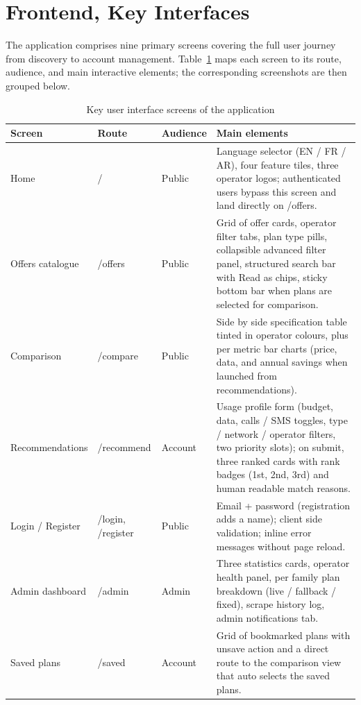 \section{Frontend, Key Interfaces}

The application comprises nine primary screens covering the full user journey from discovery to account management. Table~\ref{tab:ui-screens} maps each screen to its route, audience, and main interactive elements; the corresponding screenshots are then grouped below.

\begin{table}[H]
  \caption{Key user interface screens of the application}
  \label{tab:ui-screens}
  \centering\small
  \begin{tabular}{|p{2.6cm}|p{2.5cm}|p{1.6cm}|p{6.4cm}|}
    \hline
    \textbf{Screen} & \textbf{Route} & \textbf{Audience} & \textbf{Main elements} \\ \hline
    Home               & /           & Public  & Language selector (EN / FR / AR), four feature tiles, three operator logos; authenticated users bypass this screen and land directly on /offers. \\ \hline
    Offers catalogue   & /offers     & Public  & Grid of offer cards, operator filter tabs, plan type pills, collapsible advanced filter panel, structured search bar with \guillemotleft{}Read as\guillemotright{} chips, sticky bottom bar when plans are selected for comparison. \\ \hline
    Comparison         & /compare    & Public  & Side by side specification table tinted in operator colours, plus per metric bar charts (price, data, and annual savings when launched from recommendations). \\ \hline
    Recommendations    & /recommend  & Account & Usage profile form (budget, data, calls / SMS toggles, type / network / operator filters, two priority slots); on submit, three ranked cards with rank badges (1st, 2nd, 3rd) and human readable match reasons. \\ \hline
    Login / Register   & /login, /register & Public & Email + password (registration adds a name); client side validation; inline error messages without page reload. \\ \hline
    Admin dashboard    & /admin      & Admin   & Three statistics cards, operator health panel, per family plan breakdown (live / fallback / fixed), scrape history log, admin notifications tab. \\ \hline
    Saved plans        & /saved      & Account & Grid of bookmarked plans with unsave action and a direct route to the comparison view that auto selects the saved plans. \\ \hline

\end{tabular}
\end{table}
